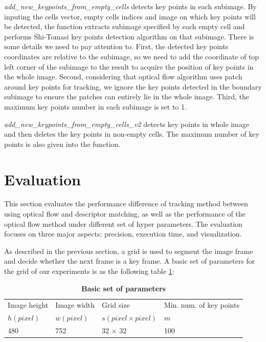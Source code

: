 \documentclass[11pt]{easychair}
\begin{document}
\emph{add\_new\_keypoints\_from\_empty\_cells} detects key points in each subimage. By inputing the cells vector, empty cells indices and image on which key points will be detected, the function extracts subimage specified by each empty cell and performs Shi-Tomasi key points detection algorithm on that subimage. There is some details we need to pay attention to. First, the detected key points coordinates are relative to the subimage, so we need to add the coordinate of top left corner of the subimage to the result to acquire the position of key points in the whole image. Second, considering that optical flow algorithm uses patch around key points for tracking, we ignore the key points detected in the boundary subimage to ensure the patches can entirely lie in the whole image. Third, the maximum key points number in each subimage is set to 1.

\emph{add\_new\_keypoints\_from\_empty\_cells\_v2} detects key points in whole image and then deletes the key points in non-empty cells. The maximum number of key points is also given into the function.

\section{Evaluation}
This section evaluates the performance difference of tracking method between using optical flow and descriptor matching, as well as the performance of the optical flow method under different set of hyper parameters. The evaluation focuses on three major aspects: precision, execution time, and visualization.

As described in the previous section, a grid is used to segment the image frame and decide whether the next frame is a key frame. A basic set of parameters for the grid of our experiments is as the following table \ref{tab:basicset}:


\begin{table}[h!]
	\begin{center}
		\caption{\textbf{Basic set of parameters}}
		\label{tab:basicset}
		\begin{tabular}{llll} %
			Image height & Image width & Grid size& Min. num. of key points\\
			$h (pixel)$ & $w (pixel)$ & $s (pixel\times pixel)$ & $m$ \\
			\hline
			480 & 752 & 32 $\times$ 32 & 100 \\
			
		\end{tabular}
	\end{center}
\end{table}
\end{document}
